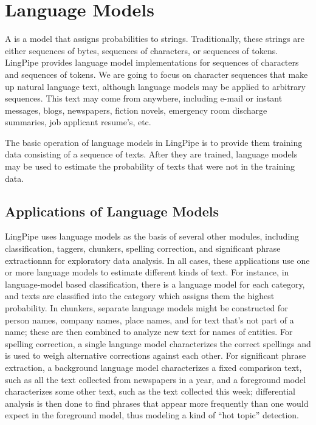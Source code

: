 \chapter{Language Models}\label{chap:lm}

A  is a model that assigns probabilities to
strings.  Traditionally, these strings are either sequences of bytes,
sequences of characters, or sequences of tokens.  LingPipe provides
language model implementations for sequences of characters and
sequences of tokens.  We are going to focus on character sequences
that make up natural language text, although language models may be
applied to arbitrary sequences.  This text may come from anywhere,
including e-mail or instant messages, blogs, newspapers, fiction
novels, emergency room discharge summaries, job applicant resume's,
etc.

The basic operation of language models in LingPipe is to provide them
training data consisting of a sequence of texts.  After they are
trained, language models may be used to estimate the probability of
texts that were not in the training data.  

\section{Applications of Language Models}

LingPipe uses language models as the basis of several other modules,
including classification, taggers, chunkers, spelling correction, and
significant phrase extractionnn for exploratory data analysis.  In all
cases, these applications use one or more language models to estimate
different kinds of text.  For instance, in language-model based
classification, there is a language model for each category, and texts
are classified into the category which assigns them the highest
probability.  In chunkers, separate language models might be
constructed for person names, company names, place names, and for text
that's not part of a name; these are then combined to analyze new text
for names of entities.  For spelling correction, a single language
model characterizes the correct spellings and is used to weigh
alternative corrections against each other.  For significant phrase
extraction, a background language model characterizes a fixed
comparison text, such as all the text collected from newspapers in a
year, and a foreground model characterizes some other text, such as
the text collected this week; differential analysis is then done to
find phrases that appear more frequently than one would expect in the
foreground model, thus modeling a kind of ``hot topic'' detection.

